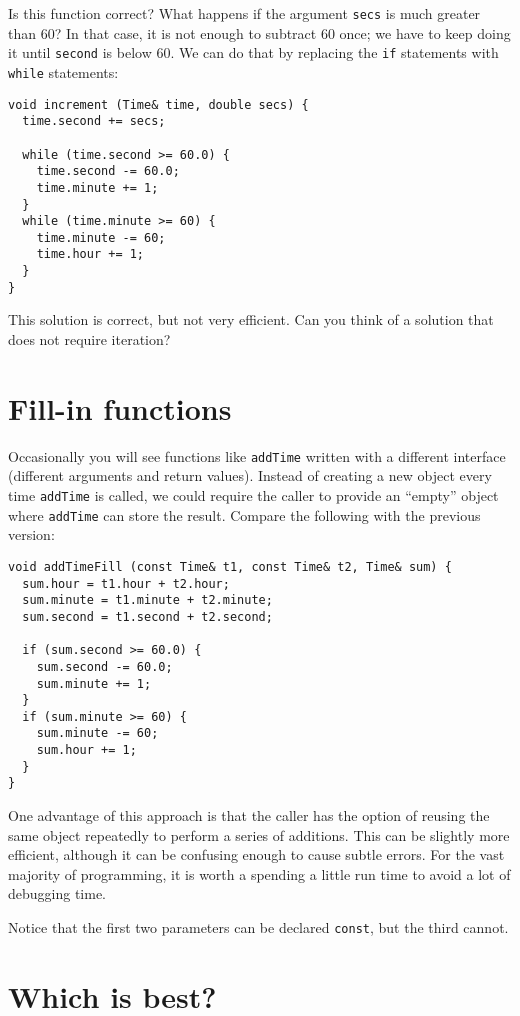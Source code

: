 Is this function correct?  What happens if the argument {\tt secs}
is much greater than 60?  In that case, it is not enough to
subtract 60 once; we have to keep doing it until {\tt second}
is below 60.  We can do that by replacing the {\tt if}
statements with {\tt while} statements:

\begin{verbatim}
void increment (Time& time, double secs) {
  time.second += secs;

  while (time.second >= 60.0) {
    time.second -= 60.0;
    time.minute += 1;
  }
  while (time.minute >= 60) {
    time.minute -= 60;
    time.hour += 1;
  }
}
\end{verbatim}
%
This solution is correct, but not very efficient.
Can you think of a solution that does not require iteration?

\section{Fill-in functions}

Occasionally you will see functions like {\tt addTime} written
with a different interface (different arguments and return values).
Instead of creating a new object every time {\tt addTime} is
called, we could require the caller to provide an ``empty''
object where {\tt addTime} can store the result.  Compare
the following with the previous version:

\begin{verbatim}
void addTimeFill (const Time& t1, const Time& t2, Time& sum) {
  sum.hour = t1.hour + t2.hour;
  sum.minute = t1.minute + t2.minute;
  sum.second = t1.second + t2.second;

  if (sum.second >= 60.0) {
    sum.second -= 60.0;
    sum.minute += 1;
  }
  if (sum.minute >= 60) {
    sum.minute -= 60;
    sum.hour += 1;
  }
}
\end{verbatim}
%
One advantage of this approach is that the caller has the option of
reusing the same object repeatedly to perform a series of additions.
This can be slightly more efficient, although it can be confusing
enough to cause subtle errors.  For the vast majority of programming,
it is worth a spending a little run time to avoid a lot of debugging
time.

Notice that the first two parameters can be declared {\tt const},
but the third cannot.

\section{Which is best?}

